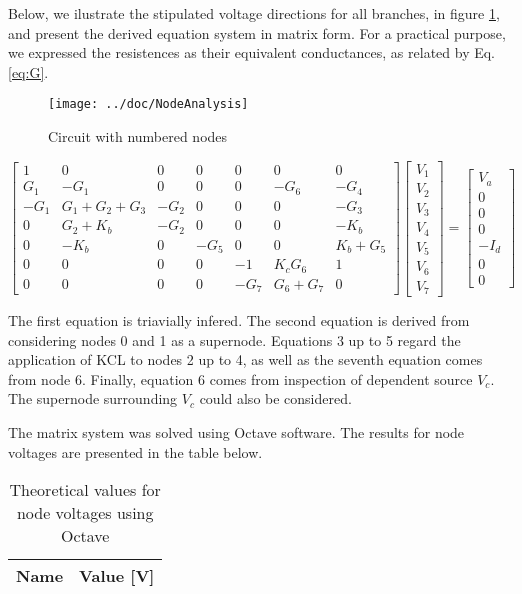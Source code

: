Below, we ilustrate the stipulated voltage directions for all branches, in figure \ref{fig:fignode}, and present the derived equation system in matrix form. For a practical purpose, we expressed the resistences as their equivalent conductances, as related by Eq.\ref{eq:G}.


\begin{figure}[H]
  \centering
  \texttt{[image: ../doc/NodeAnalysis]}
  \caption{Circuit with numbered nodes}
  \label{fig:fignode}
\end{figure}


\begin{equation*}
\begin{bmatrix}
 1 & 0 & 0 & 0 & 0 & 0 & 0 \\
 G_1 & -G_1 & 0 & 0 & 0 & -G_6 & -G_4 \\
 -G_1 & G_1+G_2+G_3 & -G_2 & 0 & 0 & 0 & -G_3\\
 0 & G_2+K_b & -G_2 & 0 & 0 & 0 & -K_b\\
 0 & -K_b & 0 & -G_5 & 0 & 0 & K_b+G_5\\
 0 & 0 & 0 & 0 & -1 & K_cG_6 & 1\\
 0 & 0 & 0 & 0 & -G_7 & G_6+G_7 & 0\end{bmatrix}
\begin{bmatrix}
 V_1\\ V_2\\ V_3\\ V_4\\ V_5\\ V_6\\ V_7\end{bmatrix}
=
\begin{bmatrix}
 V_a\\ 0\\ 0\\ 0\\ -I_d\\ 0\\ 0 \end{bmatrix}
\end{equation*}

\par The first equation is triavially infered. The second equation is derived from considering nodes 0 and 1 as a supernode. Equations 3 up to 5 regard the application of KCL to nodes 2 up to 4, as well as the seventh equation comes from node 6. Finally, equation 6 comes from inspection of dependent source $V_c$. The supernode surrounding $V_c$ could also be considered.

\par The matrix system was solved using Octave software. The results for node voltages are presented in the table below.


\begin{table}[H]
  \centering
  \begin{tabular}{|l|r|}
    \hline
    {\bf Name} & {\bf Value [V]} \\ \hline
    
  \end{tabular}
  \caption{Theoretical values for node voltages using Octave}
  \label{tab:TVoltages}
\end{table}

